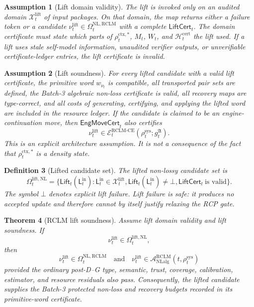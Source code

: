 \documentclass[11pt,a4paper]{article}
\newtheorem{theorem}{Theorem}[section]
\newtheorem{definition}[theorem]{Definition}
\newtheorem{assumption}[theorem]{Assumption}
\newcommand{\Acal}{\mathcal A}
\newcommand{\Xcal}{\mathcal X}
\newcommand{\RCLM}{\mathrm{RCLM}}
\newcommand{\sys}{\mathrm{sys}}
\newcommand{\ctx}{\mathrm{ctx}}
\newcommand{\cert}{\mathrm{cert}}
\newcommand{\NL}{\mathrm{NL}}
\newcommand{\NLalg}{\mathrm{NLalg}}
\newcommand{\CE}{\mathrm{CE}}
\begin{document}
\begin{assumption}[Lift domain validity]
\label{ass:rclm-lift-domain-validity}
The lift is invoked only on an audited domain \(\Xcal_t^{\mathrm{lift}}\) of input packages.  On that domain, the map returns either a failure token or a candidate \(\nu_t^{\mathrm{lift}}\in\Omega_t^{\NL,\RCLM}\) with a complete \(\mathsf{LiftCert}_t\).  The domain certificate must state which parts of \(\rho_t^{\ctx,*}\), \(M_t\), \(W_t\), and \(\mathcal H_t^{\cert}\) the lift used.  If a lift uses stale self-model information, unaudited verifier outputs, or unverifiable certificate-ledger entries, the lift certificate is invalid.
\end{assumption}

\begin{assumption}[Lift soundness]
\label{ass:rclm-lift-soundness}
For every lifted candidate with a valid lift certificate, the primitive word \(w_{\nu_t}\) is compatible, all transported pair sets are defined, the Batch-3 algebraic non-loss certificate is valid, all recovery maps are type-correct, and all costs of generating, certifying, and applying the lifted word are included in the resource ledger.  If the candidate is claimed to be an engine-continuation move, then \(\mathsf{EngMoveCert}_t\) also certifies
\[
\nu_t^{\mathrm{lift}}\in
\mathcal E_t^{\RCLM\text{-}\CE}(\rho_t^{\sys};g_t^{\mathfrak A}).
\]
This is an explicit architecture assumption.  It is not a consequence of the fact that \(\rho_t^{\ctx,*}\) is a density state.
\end{assumption}

\begin{definition}[Lifted candidate set]
\label{def:rclm-lifted-candidate-set}
The lifted non-lossy candidate set is
\[
\Omega_t^{\mathrm{lift},\NL}
=
\{\mathsf{Lift}_t(\mathsf L_t^{\mathrm{in}}):
\mathsf L_t^{\mathrm{in}}\in\Xcal_t^{\mathrm{lift}},
\mathsf{Lift}_t(\mathsf L_t^{\mathrm{in}})\neq\bot,
\mathsf{LiftCert}_t\ \text{is valid}\}.
\]
The symbol \(\bot\) denotes explicit lift failure.  Lift failure is safe: it produces no accepted update and therefore cannot by itself justify relaxing the RCP gate.
\end{definition}

\begin{theorem}[RCLM lift soundness]
\label{thm:rclm-lift-soundness}
Assume lift domain validity and lift soundness.  If
\[
\nu_t^{\mathrm{lift}}\in\Omega_t^{\mathrm{lift},\NL},
\]
then
\[
\nu_t^{\mathrm{lift}}\in\Omega_t^{\NL,\RCLM}
\quad\text{and}\quad
\nu_t^{\mathrm{lift}}\in\Acal_{\NLalg}^{\RCLM}(t,\rho_t^{\sys})
\]
provided the ordinary post-D--G type, semantic, trust, coverage, calibration, estimator, and resource residuals also pass.  Consequently, the lifted candidate supplies the Batch-3 protected non-loss and recovery budgets recorded in its primitive-word certificate.
\end{theorem}
\end{document}
